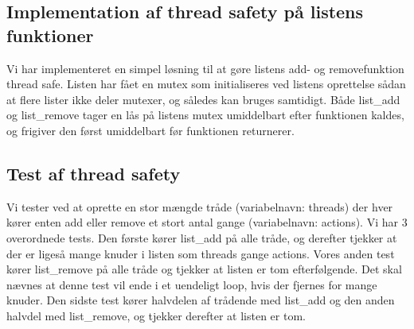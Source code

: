 \subsection{Implementation af thread safety på listens funktioner}
Vi har implementeret en simpel løsning til at gøre listens add- og removefunktion thread safe. Listen har fået en mutex som initialiseres ved listens oprettelse sådan at flere lister ikke deler mutexer, og således kan bruges samtidigt. Både list\_add og list\_remove tager en lås på listens mutex umiddelbart efter funktionen kaldes, og frigiver den først umiddelbart før funktionen returnerer. 

\subsection{Test af thread safety}
Vi tester ved at oprette en stor mængde tråde (variabelnavn: threads) der hver kører enten add eller remove et stort antal gange (variabelnavn: actions). 
Vi har 3 overordnede tests. 
Den første kører list\_add på alle tråde, og derefter tjekker at der er ligeså mange knuder i listen som threads gange actions.
Vores anden test kører list\_remove på alle tråde og tjekker at listen er tom efterfølgende. Det skal nævnes at denne test vil ende i et uendeligt loop, hvis der fjernes for mange knuder.
Den sidste test kører halvdelen af trådende med list\_add og den anden halvdel med list\_remove, og tjekker derefter at listen er tom. 

